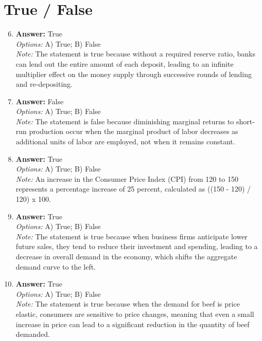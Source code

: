 \documentclass[12pt]{article}
\begin{document}
\section*{True / False}
\begin{enumerate}[label=\arabic*.]
\setcounter{enumi}{5}
\item \textbf{Answer:} True
\\ \textit{Options:} A) True; B) False
\\ \textit{Note:} The statement is true because without a required reserve ratio, banks can lend out the entire amount of each deposit, leading to an infinite multiplier effect on the money supply through successive rounds of lending and re-depositing.
\item \textbf{Answer:} False
\\ \textit{Options:} A) True; B) False
\\ \textit{Note:} The statement is false because diminishing marginal returns to short-run production occur when the marginal product of labor decreases as additional units of labor are employed, not when it remains constant.
\item \textbf{Answer:} True
\\ \textit{Options:} A) True; B) False
\\ \textit{Note:} An increase in the Consumer Price Index (CPI) from 120 to 150 represents a percentage increase of 25 percent, calculated as ((150 - 120) / 120) x 100.
\item \textbf{Answer:} True
\\ \textit{Options:} A) True; B) False
\\ \textit{Note:} The statement is true because when business firms anticipate lower future sales, they tend to reduce their investment and spending, leading to a decrease in overall demand in the economy, which shifts the aggregate demand curve to the left.
\item \textbf{Answer:} True
\\ \textit{Options:} A) True; B) False
\\ \textit{Note:} The statement is true because when the demand for beef is price elastic, consumers are sensitive to price changes, meaning that even a small increase in price can lead to a significant reduction in the quantity of beef demanded.
\end{enumerate}
\end{document}
